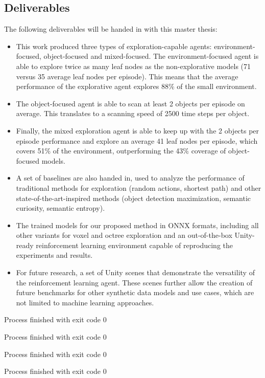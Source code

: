 \subsection{Deliverables}
The following deliverables will be handed in with this master thesis:
\begin{itemize}
    \item This work produced three types of exploration-capable agents: environment-focused, object-focused and mixed-focused.
    The environment-focused agent is able to explore twice as many leaf nodes as the non-explorative models (71 versus 35 average leaf nodes per episode). This means that the average performance of the explorative agent explores 88\% of the small environment. 
    
    \item  The object-focused agent is able to scan at least 2 objects per episode on average. This translates to a scanning speed of 2500 time steps per object.
    
    \item Finally, the mixed exploration agent is able to keep up with the 2 objects per episode performance and explore an average 41 leaf nodes per episode, which covers 51\% of the environment, outperforming the 43\% coverage of object-focused models.
   
   \item A set of baselines are also handed in, used to analyze the performance of traditional methods for exploration (random actions, shortest path) and other state-of-the-art-inspired methods (object detection maximization, semantic curiosity, semantic entropy).
   
    \item The trained models for our proposed method in ONNX formats, including all other variants for voxel and octree exploration and an out-of-the-box Unity-ready reinforcement learning environment capable of reproducing the experiments and results.

    \item For future research, a set of Unity scenes that demonstrate the versatility of the reinforcement learning agent. These scenes further allow the creation of future benchmarks for other synthetic data models and use cases, which are not limited to machine learning approaches.
\end{itemize}

\newpage



Process finished with exit code 0




Process finished with exit code 0



Process finished with exit code 0




Process finished with exit code 0
